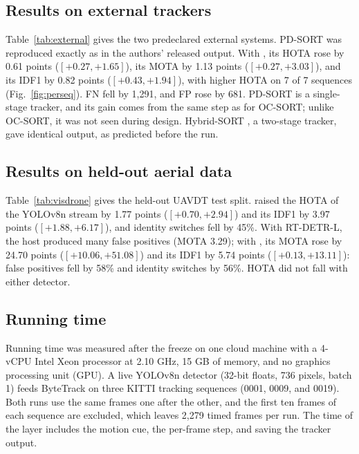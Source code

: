 \subsection{Results on external trackers}\label{sec:external}
Table~\ref{tab:external} gives the two predeclared external systems. PD-SORT
\cite{wang2025pdsort} was reproduced exactly as in the authors' released
output. With \scl{}, its HOTA rose by 0.61 points ($[+0.27,+1.65]$), its
MOTA by 1.13 points ($[+0.27,+3.03]$), and its IDF1 by 0.82 points
($[+0.43,+1.94]$), with higher HOTA on 7 of 7 sequences
(Fig.~\ref{fig:perseq}). FN fell by 1,291, and FP rose by 681. PD-SORT is a single-stage tracker, and its gain comes from the same
step as for OC-SORT; unlike OC-SORT, it was not seen during design.
Hybrid-SORT \cite{yang2024hybridsort}, a two-stage tracker, gave identical
output, as predicted before the run.



\subsection{Results on held-out aerial data}\label{sec:visdrone}
Table~\ref{tab:visdrone} gives the held-out UAVDT test split. \scl{} raised the HOTA of the YOLOv8n stream by 1.77 points
($[+0.70,+2.94]$) and its IDF1 by 3.97 points ($[+1.88,+6.17]$), and
identity switches fell by 45\%. With RT-DETR-L, the host produced many false
positives (MOTA 3.29); with \scl{}, its MOTA rose by 24.70 points
($[+10.06,+51.08]$) and its IDF1 by 5.74 points ($[+0.13,+13.11]$): false
positives fell by 58\% and identity switches by 56\%. HOTA did not fall with either
detector.



\subsection{Running time}\label{sec:latency}
\label{sec:latency-setup}Running time was measured after the freeze on one cloud machine with a 4-vCPU
Intel Xeon processor at 2.10 GHz, 15 GB of memory, and no graphics processing unit (GPU). A live YOLOv8n
detector (32-bit floats, 736 pixels, batch 1) feeds ByteTrack on three KITTI
tracking sequences (0001, 0009, and 0019). Both runs use the same frames
one after the other, and the first ten frames of each sequence are excluded,
which leaves 2,279 timed frames per run. The time of the layer includes the
motion cue, the per-frame step, and saving the tracker output.

